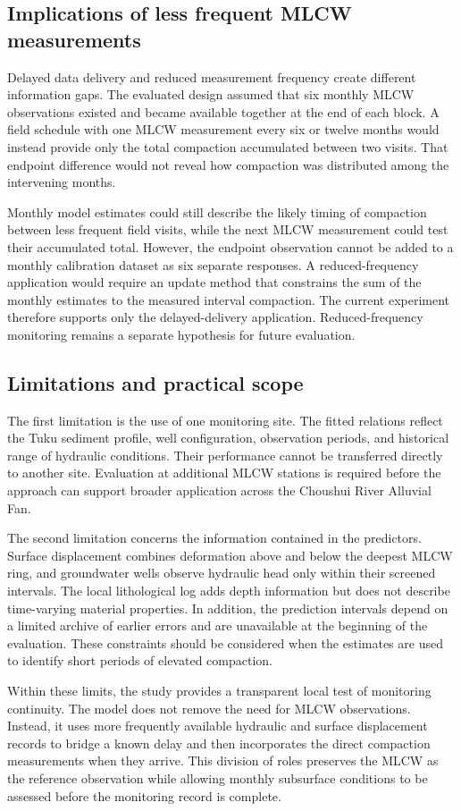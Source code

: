\subsection{Implications of less frequent MLCW measurements}
\label{subsec:discussion_reduced_sampling}

Delayed data delivery and reduced measurement frequency create different information gaps. The evaluated design assumed that six monthly MLCW observations existed and became available together at the end of each block. A field schedule with one MLCW measurement every six or twelve months would instead provide only the total compaction accumulated between two visits. That endpoint difference would not reveal how compaction was distributed among the intervening months.

Monthly model estimates could still describe the likely timing of compaction between less frequent field visits, while the next MLCW measurement could test their accumulated total. However, the endpoint observation cannot be added to a monthly calibration dataset as six separate responses. A reduced-frequency application would require an update method that constrains the sum of the monthly estimates to the measured interval compaction. The current experiment therefore supports only the delayed-delivery application. Reduced-frequency monitoring remains a separate hypothesis for future evaluation.

\subsection{Limitations and practical scope}
\label{subsec:discussion_limitations}

The first limitation is the use of one monitoring site. The fitted relations reflect the Tuku sediment profile, well configuration, observation periods, and historical range of hydraulic conditions. Their performance cannot be transferred directly to another site. Evaluation at additional MLCW stations is required before the approach can support broader application across the Choushui River Alluvial Fan.

The second limitation concerns the information contained in the predictors. Surface displacement combines deformation above and below the deepest MLCW ring, and groundwater wells observe hydraulic head only within their screened intervals. The local lithological log adds depth information but does not describe time-varying material properties. In addition, the prediction intervals depend on a limited archive of earlier errors and are unavailable at the beginning of the evaluation. These constraints should be considered when the estimates are used to identify short periods of elevated compaction.

Within these limits, the study provides a transparent local test of monitoring continuity. The model does not remove the need for MLCW observations. Instead, it uses more frequently available hydraulic and surface displacement records to bridge a known delay and then incorporates the direct compaction measurements when they arrive. This division of roles preserves the MLCW as the reference observation while allowing monthly subsurface conditions to be assessed before the monitoring record is complete.
